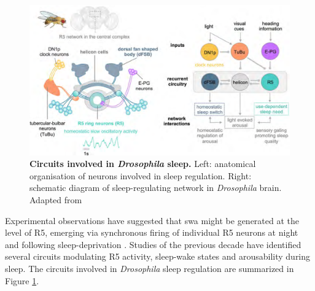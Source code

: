 \documentclass[../main.tex]{subfiles}
\begin{document}
\begin{figure}[!b]
    \centering
    \includegraphics[width=\linewidth]{../img/sleep_and_r5_network/sleep_circuit_suarez.png}
    \caption[Circuits involved in \textit{Drosophila} sleep]{
        \textbf{Circuits involved in \textit{Drosophila} sleep.}
        Left: anatomical organisation of neurons involved in sleep regulation. Right: schematic diagram of sleep-regulating network in \textit{Drosophila} brain.
        Adapted from \parencite{suarez-grimaltNeuralArchitectureSleep2021}
    }
    \label{fig:droso_sleep_circuit}
\end{figure}

Experimental observations have suggested that \gls{swa} might be generated at the level of R5, emerging via synchronous firing of individual R5 neurons at night and following sleep-deprivation \parencite{raccugliaNetworkSpecificSynchronizationElectrical2019}.
Studies of the previous decade have identified several circuits modulating R5 activity, sleep-wake states and arousability during sleep. The circuits involved in \textit{Drosophila} sleep regulation are summarized in Figure \ref{fig:droso_sleep_circuit}.
\end{document}
